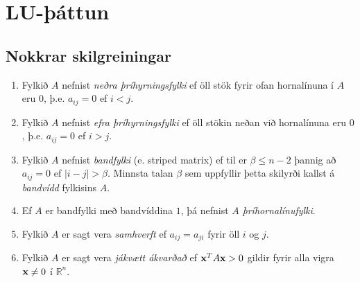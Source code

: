 \documentclass[letterpaper,10pt,icelandic]{sphinxmanual}
\begin{document}
\section{LU-þáttun}
\label{kafli08:index-16}\label{kafli08:lu-attun}

\subsection{Nokkrar skilgreiningar}
\label{kafli08:nokkrar-skilgreiningar}\begin{enumerate}
\item {} 
Fylkið \(A\) nefnist \emph{neðra þríhyrningsfylki} ef öll stök fyrir
ofan hornalínuna í \(A\) eru \(0\), þ.e. \(a_{ij}=0\)
ef \(i<j\).

\item {} 
Fylkið \(A\) nefnist \emph{efra þríhyrningsfylki} ef öll stökin neðan
við hornalínuna eru \(0\), þ.e. \(a_{ij}=0\) ef
\(i>j\).

\item {} 
Fylkið \(A\) nefnist \emph{bandfylki} (e. striped matrix) ef til er
\(\beta \leq n-2\) þannig að \(a_{ij}=0\) ef
\(|i-j|>\beta\). Minnsta talan \(\beta\) sem uppfyllir þetta
skilyrði kallst á \emph{bandvídd} fylkisins \(A\).

\item {} 
Ef \(A\) er bandfylki með bandvíddina \(1\), þá nefnist
\(A\) \emph{þríhornalínufylki}.

\item {} 
Fylkið \(A\) er sagt vera \emph{samhverft} ef \(a_{ij}=a_{ji}\)
fyrir öll \(i\) og \(j\).

\item {} 
Fylkið \(A\) er sagt vera \emph{jákvætt ákvarðað} ef
\(\mbox{${\bf x}$}^TA\mbox{${\bf x}$}>0\) gildir fyrir alla vigra
\(\mbox{${\bf x}$}\neq 0\) í \({\mathbb  R}^n\).

\end{enumerate}
\end{document}
